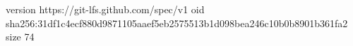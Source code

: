 version https://git-lfs.github.com/spec/v1
oid sha256:31df1c4ecf880d9871105aaef5eb2575513b1d098bea246c10b0b8901b361fa2
size 74
